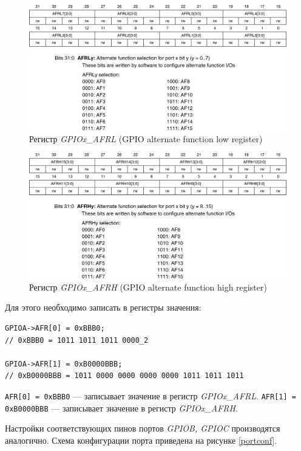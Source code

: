 \begin{figure}[H]
\begin{center}
\includegraphics[scale=0.25]{Image/43.jpg} 
\end{center}
\caption{Регистр \textit{GPIOx\_AFRL} (GPIO alternate function low register)}
\end{figure}
\begin{figure}[H]
\begin{center}
\includegraphics[scale=0.25]{Image/44.jpg} 
\end{center}
\caption{Регистр \textit{GPIOx\_AFRH} (GPIO alternate function high register)}
\end{figure}
Для этого необходимо записать в регистры значения:
\begin{verbatim}
GPIOA->AFR[0] = 0xBBB0;
// 0xBBB0 = 1011 1011 1011 0000_2 

GPIOA->AFR[1] = 0xB0000BBB;
// 0xB0000BBB = 1011 0000 0000 0000 0000 1011 1011 1011 
\end{verbatim}
\verb#AFR[0] = 0xBBB0# --- записывает значение в регистр \textit{GPIOx\_AFRL}.
\verb#AFR[1] = 0xB0000BBB# --- записывает значение в регистр \textit{GPIOx\_AFRH}.

Настройки соответствующих пинов портов \textit{GPIOB, GPIOC} производятся аналогично. Схема конфигурации порта приведена на рисунке \ref{portconf}. 

